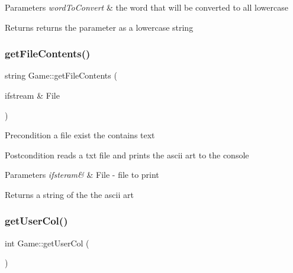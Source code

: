 \begin{DoxyParams}{Parameters}
{\em word\+To\+Convert} & the word that will be converted to all lowercase \\
\hline
\end{DoxyParams}
\begin{DoxyReturn}{Returns}
returns the parameter as a lowercase string 
\end{DoxyReturn}
\mbox{\label{classGame_ac136d5eeb0d8aa650a0bb90a94abff46}} 
\subsubsection{\texorpdfstring{get\+File\+Contents()}{getFileContents()}}
{\footnotesize\ttfamily string Game\+::get\+File\+Contents (\begin{DoxyParamCaption}\item[{ifstream \&}]{File }\end{DoxyParamCaption})}

\begin{DoxyPrecond}{Precondition}
a file exist the contains text 
\end{DoxyPrecond}
\begin{DoxyPostcond}{Postcondition}
reads a txt file and prints the ascii art to the console 
\end{DoxyPostcond}

\begin{DoxyParams}{Parameters}
{\em ifsteram\&} & File -\/ file to print \\
\hline
\end{DoxyParams}
\begin{DoxyReturn}{Returns}
a string of the the ascii art 
\end{DoxyReturn}
\mbox{\label{classGame_ab57a39bf1d9f48bdcc60acb5d598af22}} 
\subsubsection{\texorpdfstring{get\+User\+Col()}{getUserCol()}}
{\footnotesize\ttfamily int Game\+::get\+User\+Col (\begin{DoxyParamCaption}{ }\end{DoxyParamCaption})}

